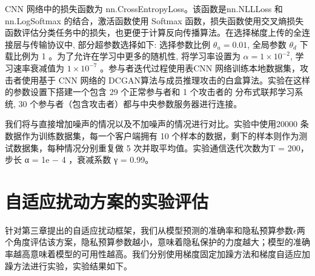 CNN 网络中的损失函数为 nn.CrossEntropyLoss。该函数是nn.NLLLoss 和 nn.LogSoftmax 的结合，激活函数使用 Softmax 函数，损失函数使用交叉熵损失函数评估分类任务中的损失，也更便于计算反向传播算法。在选择梯度上传的全连接层与传输协议中, 部分超参数选择如下: 选择参数比例 $\theta_{u}=0.01$, 全局参数 $\theta_{d}$ 下载比例为 1 。为了允许在学习中更多的随机性, 将学习率设置为 $\alpha=1 \times 10^{-2}$, 学习速率衰减值为 $1 \times 10^{-7}$ 。参与者迭代过程使用表$\mathrm{CNN}$ 网络训练本地数据集，攻击者使用基于 CNN 网络的 DCGAN算法与成员推理攻击的白盒算法。实验在这样的参数设置下搭建一个包含 29 个正常参与者和 1 个攻击者的 分布式联邦学习系统, 30 个参与者（包含攻击者）都与中央参数服务器进行连接。

我们将与直接增加噪声的情况以及不加噪声的情况进行对比。实验中使用20000 条数据作为训练数据集，每一个客户端拥有 10 个样本的数据，剩下的样本则作为测试数据集，每种情况分别重复做 5 次并取平均值。实验通信迭代次数为T = 200，步长 α = 1e − 4 ，衰减系数 γ = 0.99。

\section{自适应扰动方案的实验评估}
针对第三章提出的自适应扰动框架，我们从模型预测的准确率和隐私预算参数$\epsilon$两个角度评估该方案，隐私预算参数越小，意味着隐私保护的力度越大；模型的准确率越高意味着模型的可用性越高。我们分别使用梯度固定加躁方法和梯度自适应加躁方法进行实验，实验结果如下。


